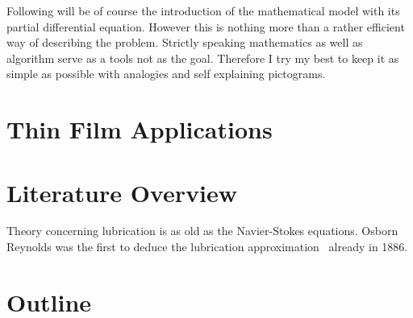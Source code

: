 Following will be of course the introduction of the mathematical model with its partial differential equation. 
However this is nothing more than a rather efficient way of describing the problem.
Strictly speaking mathematics as well as algorithm serve as a tools not as the goal. 
Therefore I try my best to keep it as simple as possible with analogies and self explaining pictograms.

\section{Thin Film Applications}
\label{section:applications}

\section{Literature Overview}
\label{section:literature}
Theory concerning lubrication is as old as the Navier-Stokes equations. 
Osborn Reynolds was the first to deduce the lubrication approximation~\cite{ReynoldsLubr} already in 1886.

\section{Outline}
\label{section:outline}



